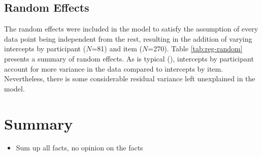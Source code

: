 \subsection{Random Effects}
The random effects were included in the model to satisfy the assumption of every data point being independent from the rest, resulting in the addition of varying intercepts by participant ($N$=81) and item ($N$=270). Table \ref{tab:reg-random} presents a summary of random effects. As is typical (\cite{Winter+2019}), intercepts by participant account for more variance in the data compared to intercepts by item. Nevertheless, there is some considerable residual variance left unexplained in the model.
\begin{table}[h]
\centering
\label{tab:reg-random}
\caption[Summary of random effects from the experimental model]{Summary of random effects from the experimental model.}
\end{table}

\section{Summary} \label{sec:stats_summary}
\begin{itemize}
\item Sum up all facts, no opinion on the facts
\end{itemize}
